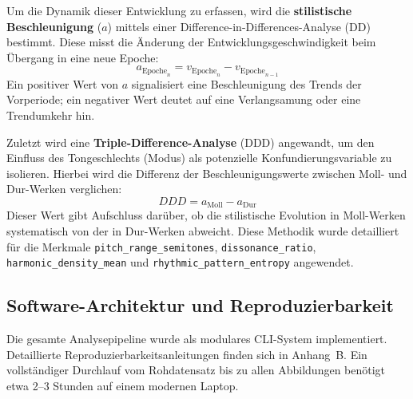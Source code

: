\documentclass[12pt,a4paper]{article}
\theoremstyle{definition}
\begin{document}
Um die Dynamik dieser Entwicklung zu erfassen, wird die \textbf{stilistische Beschleunigung} ($a$) mittels einer Difference-in-Differences-Analyse (DD) bestimmt. Diese misst die Änderung der Entwicklungsgeschwindigkeit beim Übergang in eine neue Epoche:
\begin{equation}
a_{\text{Epoche}_n} = v_{\text{Epoche}_n} - v_{\text{Epoche}_{n-1}}
\end{equation}
Ein positiver Wert von $a$ signalisiert eine Beschleunigung des Trends der Vorperiode; ein negativer Wert deutet auf eine Verlangsamung oder eine Trendumkehr hin.

Zuletzt wird eine \textbf{Triple-Difference-Analyse} (DDD) angewandt, um den Einfluss des Tongeschlechts (Modus) als potenzielle Konfundierungsvariable zu isolieren. Hierbei wird die Differenz der Beschleunigungswerte zwischen Moll- und Dur-Werken verglichen:
\begin{equation}
DDD = a_{\text{Moll}} - a_{\text{Dur}}
\end{equation}
Dieser Wert gibt Aufschluss darüber, ob die stilistische Evolution in Moll-Werken systematisch von der in Dur-Werken abweicht. Diese Methodik wurde detailliert für die Merkmale \texttt{pitch\_range\_semitones}, \texttt{dissonance\_ratio}, \texttt{harmonic\_density\_mean} und \texttt{rhythmic\_pattern\_entropy} angewendet.

\subsection{Software-Architektur und Reproduzierbarkeit}
Die gesamte Analysepipeline wurde als modulares CLI-System implementiert. Detaillierte Reproduzierbarkeitsanleitungen finden sich in Anhang~B. Ein vollständiger Durchlauf vom Rohdatensatz bis zu allen Abbildungen benötigt etwa 2--3 Stunden auf einem modernen Laptop.
\end{document}
